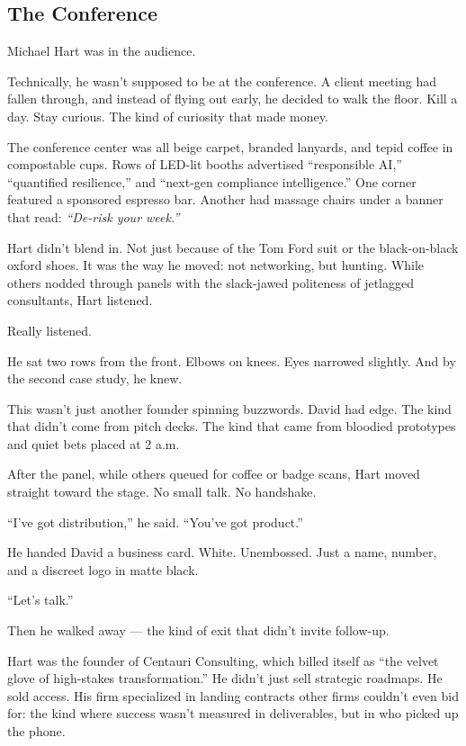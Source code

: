\subsection{The Conference}

Michael Hart was in the audience.

Technically, he wasn’t supposed to be at the conference. A client meeting had fallen through, and instead 
of flying out early, he decided to walk the floor. Kill a day. Stay curious. The kind of curiosity 
that made money.

The conference center was all beige carpet, branded lanyards, and tepid coffee in compostable cups. Rows of 
LED-lit booths advertised “responsible AI,” “quantified resilience,” and “next-gen compliance intelligence.” 
One corner featured a sponsored espresso bar. Another had massage chairs under a banner that read: 
\textit{“De-risk your week.”}

Hart didn’t blend in. Not just because of the Tom Ford suit or the black-on-black oxford shoes. It was the 
way he moved: not networking, but hunting. While others nodded through panels with the slack-jawed politeness 
of jetlagged consultants, Hart listened.

Really listened.

He sat two rows from the front. Elbows on knees. Eyes narrowed slightly. And by the second case study, he knew.

This wasn’t just another founder spinning buzzwords. David had edge. The kind that didn’t come from pitch decks. 
The kind that came from bloodied prototypes and quiet bets placed at 2 a.m.

After the panel, while others queued for coffee or badge scans, Hart moved straight toward the stage. No small talk. 
No handshake.

“I’ve got distribution,” he said. “You’ve got product.”

He handed David a business card. White. Unembossed. Just a name, number, and a discreet logo in matte black.

“Let’s talk.”

Then he walked away — the kind of exit that didn’t invite follow-up.

Hart was the founder of Centauri Consulting, which billed itself as “the velvet glove of high-stakes transformation.” 
He didn’t just sell strategic roadmaps. He sold access. His firm specialized in landing contracts other firms 
couldn’t even bid for: the kind where success wasn’t measured in deliverables, but in who picked up the phone.

